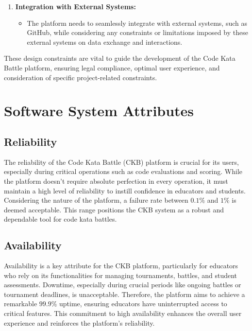 \begin{enumerate}
    \item \textbf{Integration with External Systems:}
          \begin{itemize}
              \item The platform needs to seamlessly integrate with external systems, such as GitHub, while considering any constraints or limitations imposed by these external systems on data exchange and interactions.
          \end{itemize}
\end{enumerate}

These design constraints are vital to guide the development of the Code Kata Battle platform, ensuring legal compliance, optimal user experience, and consideration of specific project-related constraints.




\section{Software System Attributes}
\label{sec:software_system_attributes}%

\subsection{Reliability}
\label{subsec:reliability}%
The reliability of the Code Kata Battle (CKB) platform is crucial for its users, especially during critical operations such as code evaluations and scoring. 
While the platform doesn't require absolute perfection in every operation, it must maintain a high level of reliability to instill confidence in educators and students. 
Considering the nature of the platform, a failure rate between $0.1\%$ and $1\%$ is deemed acceptable. 
This range positions the CKB system as a robust and dependable tool for code kata battles.

\subsection{Availability}
\label{subsec:availability}%
Availability is a key attribute for the CKB platform, particularly for educators who rely on its functionalities for managing tournaments, battles, and student assessments. 
Downtime, especially during crucial periods like ongoing battles or tournament deadlines, is unacceptable. Therefore, the platform aims to achieve a remarkable $99.9\%$ uptime, ensuring educators have uninterrupted access to critical features. 
This commitment to high availability enhances the overall user experience and reinforces the platform's reliability.

